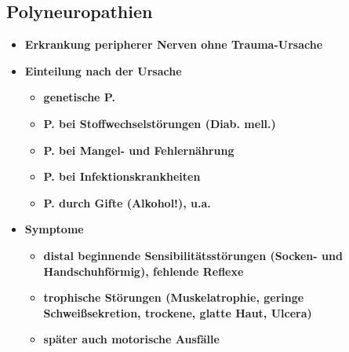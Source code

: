 \subsection{Polyneuropathien}
	\begin{itemize}
		\item \textbf{Erkrankung peripherer Nerven ohne Trauma-Ursache}
		\item \textbf{Einteilung nach der Ursache}
			\begin{itemize}
				\item \textbf{genetische P.}
				\item \textbf{P. bei Stoffwechselstörungen (Diab. mell.)}
				\item \textbf{P. bei Mangel- und Fehlernährung}
				\item \textbf{P. bei Infektionskrankheiten}
				\item \textbf{P. durch Gifte (Alkohol!), u.a.}
			\end{itemize}				
		\item \textbf{Symptome}
			\begin{itemize}
				\item \textbf{distal beginnende Sensibilitätsstörungen (Socken- und Handschuhförmig), fehlende Reflexe}
				\item \textbf{trophische Störungen (Muskelatrophie, geringe Schweißsekretion, trockene, glatte Haut, Ulcera)}
				\item \textbf{später auch motorische Ausfälle}
			\end{itemize}
	\end{itemize}